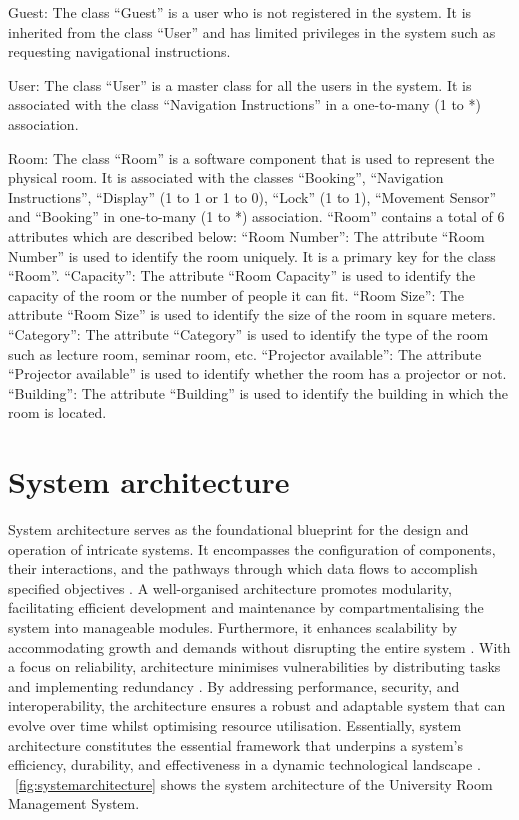 \documentclass[conference,onecolumn]{IEEEtran}
\begin{document}
		Guest: The class ``Guest'' is a user who is not registered in the system. It is inherited from the class ``User'' and has limited privileges in the system such as requesting navigational instructions.

		User: The class ``User'' is a master class for all the users in the system. It is associated with the class ``Navigation Instructions'' in a one-to-many (1 to *) association.

		Room: The class ``Room'' is a software component that is used to represent the physical room. It is associated with the classes ``Booking'', ``Navigation Instructions'', ``Display'' (1 to 1 or 1 to 0), ``Lock'' (1 to 1), ``Movement Sensor'' and ``Booking'' in one-to-many (1 to *) association. ``Room'' contains a total of 6 attributes which are described below:
		``Room Number'': The attribute ``Room Number'' is used to identify the room uniquely. It is a primary key for the class ``Room''.
		``Capacity'': The attribute ``Room Capacity'' is used to identify the capacity of the room or the number of people it can fit.
		``Room Size'': The attribute ``Room Size'' is used to identify the size of the room in square meters.
		``Category'': The attribute ``Category'' is used to identify the type of the room such as lecture room, seminar room, etc.
		``Projector available'': The attribute ``Projector available'' is used to identify whether the room has a projector or not.
		``Building'': The attribute ``Building'' is used to identify the building in which the room is located.


\section{System architecture}
	System architecture serves as the foundational blueprint for the design and operation of intricate systems. It encompasses the configuration of components, their interactions, and the pathways through which data flows to accomplish specified objectives \cite{steen2007distributed}. A well-organised architecture promotes modularity, facilitating efficient development and maintenance by compartmentalising the system into manageable modules. Furthermore, it enhances scalability by accommodating growth and demands without disrupting the entire system \cite{kotseruba2016review}. With a focus on reliability, architecture minimises vulnerabilities by distributing tasks and implementing redundancy \cite{steen2007distributed}. By addressing performance, security, and interoperability, the architecture ensures a robust and adaptable system that can evolve over time whilst optimising resource utilisation. Essentially, system architecture constitutes the essential framework that underpins a system's efficiency, durability, and effectiveness in a dynamic technological landscape \cite{kotseruba2016review}. \figurename~\ref{fig:systemarchitecture} shows the system architecture of the University Room Management System.
\end{document}
